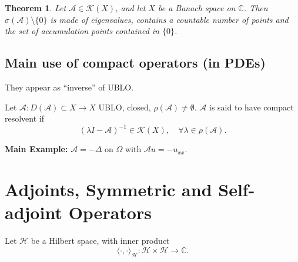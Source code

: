 \documentclass[12pt, oneside]{book}
\newtheorem{theo}{Theorem}[section]
\newcommand{\A}{\mathscr{A}}
\begin{document}
\begin{theo}
Let	$\mathscr{A}\in\mathcal{K}(X)$, and let $X$ be a Banach space on $\mathbb{C}$. Then $\sigma(\mathscr{A})\setminus\{0\}$ is made of eigenvalues, contains a countable number of points and the set of accumulation points contained in $\{0\}$.
\end{theo}

\subsection*{Main use of compact operators (in PDEs)}
They appear as ``inverse'' of UBLO.

\begin{definition}
Let $\A:D(\A)\subset X\to X$ UBLO, closed, $\rho(\A) \neq \emptyset$.
$\mathscr{A}$ is said to have compact resolvent if
\vspace{-2mm}
\[
(\lambda I-\mathscr{A})^{-1}\in\mathcal{K}(X),
\quad \forall\lambda\in\rho(\mathscr{A}).
\]
\end{definition}
\textbf{Main Example:}
$\mathscr{A}=-\Delta$ on $\Omega$ with
$\mathscr{A}u=-u_{xx}$.

\section{Adjoints, Symmetric and Self-adjoint Operators}
Let $\mathscr{H}$ be a Hilbert space, with inner product
\vspace{-2mm}
\[
\langle\cdot,\cdot\rangle_{\mathscr{H}}:\mathscr{H}\times \mathscr{H}\to\mathbb{C}.
\]
\end{document}

